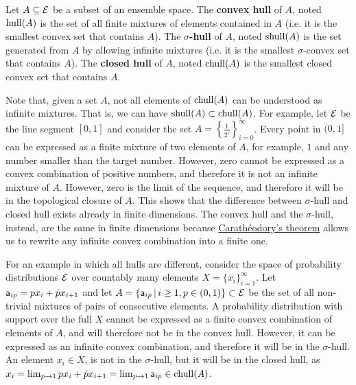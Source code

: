 \begin{mathSection}
\begin{defn}
	Let $A \subseteq \Ens$ be a subset of an ensemble space. The \textbf{convex hull} of $A$, noted $\hull(A)$ is the set of all finite mixtures of elements contained in $A$ (i.e. it is the smallest convex set that contains $A$). The \textbf{$\sigma$-hull} of $A$, noted $\shull(A)$ is the set generated from $A$ by allowing infinite mixtures (i.e. it is the smallest $\sigma$-convex set that contains $A$). The \textbf{closed hull} of $A$, noted $\chull(A)$ is the smallest closed convex set that contains $A$. 
\end{defn}

\begin{remark}
	Note that, given a set $A$, not all elements of $\chull(A)$ can be understood as infinite mixtures. That is, we can have $\shull(A) \subset \chull(A)$. For example, let $\Ens$ be the line segment $[0,1]$ and consider the set $A=\left\{\frac{1}{2^i}\right\}_{i=0}^{\infty}$. Every point in $(0,1]$ can be expressed as a finite mixture of two elements of $A$, for example, $1$ and any number smaller than the target number. However, zero cannot be expressed as a convex combination of positive numbers, and therefore it is not an infinite mixture of $A$. However, zero is the limit of the sequence, and therefore it will be in the topological closure of $A$. This shows that the difference between $\sigma$-hull and closed hull exists already in finite dimensions. The convex hull and the $\sigma$-hull, instead, are the same in finite dimensions because \href{https://en.wikipedia.org/wiki/Carath%C3%A9odory%27s_theorem_%28convex_hull%29}{Carathéodory's theorem} allows us to rewrite any infinite convex combination into a finite one.
	
	For an example in which all hulls are different, consider the space of probability distributions $\Ens$ over countably many elements $X = \{x_i\}_{i=1}^{\infty}$. Let $\ens[a]_{ip} = p x_i + \bar{p} x_{i+1}$ and let $A = \left\{ \ens[a]_{ip}  \, | \, i \geq 1, p \in (0,1)  \right\} \subset \Ens$ be the set of all non-trivial mixtures of pairs of consecutive elements. A probability distribution with support over the full $X$ cannot be expressed as a finite convex combination of elements of $A$, and will therefore not be in the convex hull. However, it can be expressed as an infinite convex combination, and therefore it will be in the $\sigma$-hull. An element $x_i \in X$, is not in the $\sigma$-hull, but it will be in the closed hull, as $x_i = \lim_{p \to 1} p x_i + \bar{p} x_{i+1} = \lim_{p \to 1} \ens[a]_{ip} \in \chull(A)$.
\end{remark}


\end{mathSection}
